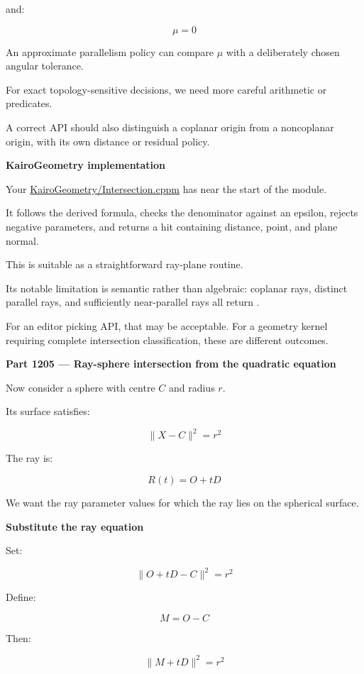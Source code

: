 and:

\[
\mu=0
\]

An approximate parallelism policy can compare \(\mu\) with a deliberately chosen angular tolerance.

For exact topology-sensitive decisions, we need more careful arithmetic or predicates.

A correct API should also distinguish a coplanar origin from a noncoplanar origin, with its own distance or residual policy.

\textbf{KairoGeometry implementation}

Your \href{https://github.com/swayam8624/KairoGeometry/blob/master/Intersection.cppm?utm_source=chatgpt.com}{KairoGeometry/Intersection.cppm} has  near the start of the module.

It follows the derived formula, checks the denominator against an epsilon, rejects negative parameters, and returns a hit containing distance, point, and plane normal.

This is suitable as a straightforward ray-plane routine.

Its notable limitation is semantic rather than algebraic: coplanar rays, distinct parallel rays, and sufficiently near-parallel rays all return .

For an editor picking API, that may be acceptable. For a geometry kernel requiring complete intersection classification, these are different outcomes.

\textbf{Part 1205 --- Ray-sphere intersection from the quadratic equation}

Now consider a sphere with centre \(C\) and radius \(r\).

Its surface satisfies:

\[
\boxed{ \|X-C\|^2=r^2 }
\]

The ray is:

\[
R(t)=O+tD
\]

We want the ray parameter values for which the ray lies on the spherical surface.

\textbf{Substitute the ray equation}

Set:

\[
\|O+tD-C\|^2=r^2
\]

Define:

\[
M=O-C
\]

Then:

\[
\|M+tD\|^2=r^2
\]

